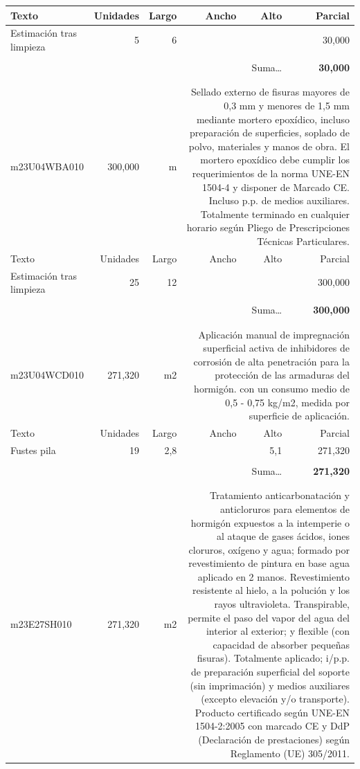 \documentclass{book}%
\begin{document}
\begin{longtable}{lrrrrr}
Texto&Unidades&Largo&Ancho&Alto&Parcial\\%
\hline%
\multicolumn{1}{p{3.5cm}}{Estimación tras limpieza}&5&6&&&    30,000\\%
&&&&&\\%
\multicolumn{5}{r}{Suma\ldots}&\textbf{    30,000}\\%
\hline%
&&&&&\\%
&&&&&\\%
m23U04WBA010&   300,000& m&\multicolumn{3}{p{6cm}}{\scriptsize Sellado externo de fisuras mayores de 0,3 mm y menores de 1,5 mm mediante mortero epoxídico, incluso preparación de superficies, soplado de polvo, materiales y manos de obra. El mortero epoxídico debe cumplir los requerimientos de la norma UNE-EN 1504-4 y disponer de Marcado CE. Incluso p.p. de medios auxiliares. Totalmente terminado en cualquier horario según Pliego de Prescripciones Técnicas Particulares.\normalsize}\\%
Texto&Unidades&Largo&Ancho&Alto&Parcial\\%
\hline%
\multicolumn{1}{p{3.5cm}}{Estimación tras limpieza}&25&12&&&   300,000\\%
&&&&&\\%
\multicolumn{5}{r}{Suma\ldots}&\textbf{   300,000}\\%
\hline%
&&&&&\\%
&&&&&\\%
m23U04WCD010&   271,320& m2&\multicolumn{3}{p{6cm}}{\scriptsize Aplicación manual de impregnación superficial activa de inhibidores de corrosión de alta penetración para la protección de las armaduras del hormigón. con un consumo medio de 0,5 - 0,75 kg/m2, medida por superficie de aplicación.\normalsize}\\%
Texto&Unidades&Largo&Ancho&Alto&Parcial\\%
\hline%
\multicolumn{1}{p{3.5cm}}{Fustes pila}&19&2,8&&5,1&   271,320\\%
&&&&&\\%
\multicolumn{5}{r}{Suma\ldots}&\textbf{   271,320}\\%
\hline%
&&&&&\\%
&&&&&\\%
m23E27SH010&   271,320& m2&\multicolumn{3}{p{6cm}}{\scriptsize Tratamiento anticarbonatación y anticloruros para elementos de hormigón expuestos a la intemperie o al ataque de gases ácidos, iones cloruros, oxígeno y agua; formado por revestimiento de pintura en base agua aplicado en 2 manos. Revestimiento resistente al hielo, a la polución y los rayos ultravioleta. Transpirable, permite el paso del vapor del agua del interior al exterior; y flexible (con capacidad de absorber pequeñas fisuras). Totalmente aplicado; i/p.p. de preparación superficial del soporte (sin imprimación) y medios auxiliares (excepto elevación y/o transporte). Producto certificado según UNE-EN 1504-2:2005 con marcado CE y DdP (Declaración de prestaciones) según Reglamento (UE) 305/2011.\normalsize}\\%

\end{longtable}
\end{document}

